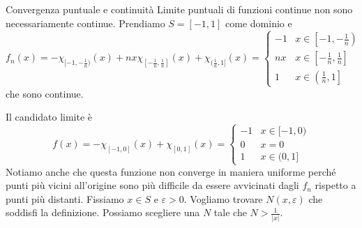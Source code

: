 \documentclass[a4paper]{article}
\begin{document}
\begin{radioactive}
\begin{snippetexample}{Convergenza puntuale e continuità}
    Limite puntuali di funzioni continue non sono necessariamente continue.
    Prendiamo \(S = [-1,1]\) come dominio e
    \[
        f_n(x) = -\chi_{[-1, -\frac{1}{n})}(x) + nx \chi_{[-\frac{1}{n}, \frac{1}{n}]}(x) + \chi_{(\frac{1}{n}, 1]}(x)
        = \begin{cases}
            -1 & x \in \left[-1, -\frac{1}{n}\right) \\
            nx & x \in \left[-\frac{1}{n}, \frac{1}{n}\right] \\
            1 & x \in \left(\frac{1}{n}, 1\right]
        \end{cases}
    \]
    che sono continue.
    \begin{center}
    \end{center}
    Il candidato limite è \[
        f(x) = -\chi_{[-1, 0]}(x) + \chi_{[0,1]}(x) = \begin{cases}
            -1 & x \in [-1, 0) \\
            0 & x = 0 \\
            1 & x \in (0, 1]
        \end{cases}
    \]
    Notiamo anche che questa funzione non converge in maniera uniforme
    perché punti più vicini all'origine sono più difficile da essere avvicinati dagli \(f_n\)
    rispetto a punti più distanti.
    Fissiamo \(x \in S\) e \(\varepsilon > 0\).
    Vogliamo trovare \(N(x, \varepsilon)\) che soddisfi la definizione.
    Possiamo scegliere una \(N\) tale che \(N > \frac{1}{|x|}\).
\end{snippetexample}
\end{radioactive}
\end{document}
